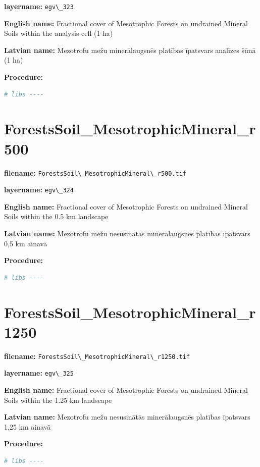 \documentclass[
]{book}
\newcommand{\passthrough}[1]{#1}
\begin{document}
\textbf{layername:} \passthrough{\lstinline!egv\_323!}

\textbf{English name:} Fractional cover of Mesotrophic Forests on undrained Mineral Soils within the analysis cell (1 ha)

\textbf{Latvian name:} Mezotrofu mežu minerālaugsnēs platības īpatsvars analīzes šūnā (1 ha)

\textbf{Procedure:}

\begin{lstlisting}[language=R]
# libs ----
\end{lstlisting}

\section{ForestsSoil\_MesotrophicMineral\_r500}\label{ch06.324}

\textbf{filename:} \passthrough{\lstinline!ForestsSoil\_MesotrophicMineral\_r500.tif!}

\textbf{layername:} \passthrough{\lstinline!egv\_324!}

\textbf{English name:} Fractional cover of Mesotrophic Forests on undrained Mineral Soils within the 0.5 km landscape

\textbf{Latvian name:} Mezotrofu mežu nesusinātās minerālaugsnēs platības īpatsvars 0,5 km ainavā

\textbf{Procedure:}

\begin{lstlisting}[language=R]
# libs ----
\end{lstlisting}

\section{ForestsSoil\_MesotrophicMineral\_r1250}\label{ch06.325}

\textbf{filename:} \passthrough{\lstinline!ForestsSoil\_MesotrophicMineral\_r1250.tif!}

\textbf{layername:} \passthrough{\lstinline!egv\_325!}

\textbf{English name:} Fractional cover of Mesotrophic Forests on undrained Mineral Soils within the 1.25 km landscape

\textbf{Latvian name:} Mezotrofu mežu nesusinātās minerālaugsnēs platības īpatsvars 1,25 km ainavā

\textbf{Procedure:}

\begin{lstlisting}[language=R]
# libs ----
\end{lstlisting}
\end{document}
